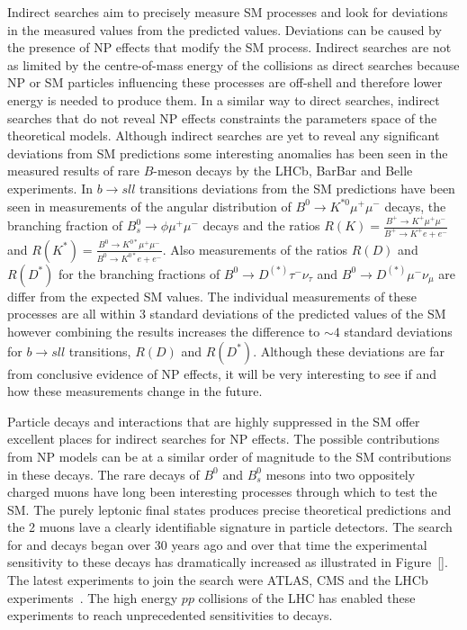 Indirect searches aim to precisely measure SM processes and look for deviations in the measured values from the predicted values. Deviations can be caused by the presence of NP effects that modify the SM process. 
Indirect searches are not as limited by the centre-of-mass energy of the collisions as direct searches because NP or SM particles influencing these processes are off-shell and therefore lower energy is needed to produce them. In a similar way to direct searches, indirect searches that do not reveal NP effects constraints the parameters space of the theoretical models. Although indirect searches are yet to reveal any significant deviations from SM predictions some interesting anomalies has been seen in the measured results of rare $B$-meson decays by the LHCb, BarBar and Belle experiments. In $b \to sll$ transitions deviations from the SM predictions have been seen in measurements of the angular distribution of $B^0 \to K^{*0} \mu^{+} \mu^{-}$ decays, the branching fraction of $B^{0}_{s} \to \phi  \mu^{+} \mu^{-}$ decays and the ratios $R(K) = \frac{B^+ \to K^+ \mu^{+} \mu^{-}}{B^+ \to K^+ e{+} e^{-}}$ and $R(K^{*}) = \frac{B^0 \to K^{0*} \mu^{+} \mu^{-}}{B^0 \to K^{0*} e{+} e^{-}}$. Also measurements of the ratios $R(D)$ and $R(D^*)$ for the branching fractions of $B^0 \to D^{(*)} \tau^{-} \nu_{\tau}$ and $B^0 \to D^{(*)} \mu^{-} \nu_{\mu}$ are differ from the expected SM values. The individual measurements of these processes are all within 3 standard deviations of the predicted values of the SM however combining the results increases the difference to $\sim 4$ standard deviations for $b \to sll$ transitions, $R(D)$ and $R(D^*)$. Although these deviations are far from conclusive evidence of NP effects, it will be very interesting to see if and how these measurements change in the future.


Particle decays and interactions that are highly suppressed in the SM offer excellent places for indirect searches for NP effects. The possible contributions from NP models can be at a similar order of magnitude to the SM contributions in these decays. The rare decays of $B^{0}$ and $B^{0}_{s}$ mesons into two oppositely charged muons have long been interesting processes through which to test the SM. The purely leptonic final states produces precise theoretical predictions and the 2 muons lave a clearly identifiable signature in particle detectors. The search for \bdmumu and \bsmumu decays began over 30 years ago and over that time the experimental sensitivity to these decays has dramatically increased as illustrated in Figure~\ref{}. The latest experiments to join the search were ATLAS, CMS and the LHCb experiments~\cite{Aad:2012pn,Aaboud:2016ire, Chatrchyan:2011kr, Chatrchyan:2012rga, Chatrchyan:2013bka, Aaij:2011rja, LHCb:2011ac,Aaij:2012ac,Aaij:2012nna,Aaij:2013aka,CMS:2014xfa}. The high energy $pp$ collisions of the LHC has enabled these experiments to reach unprecedented sensitivities to \bmumu decays. 

